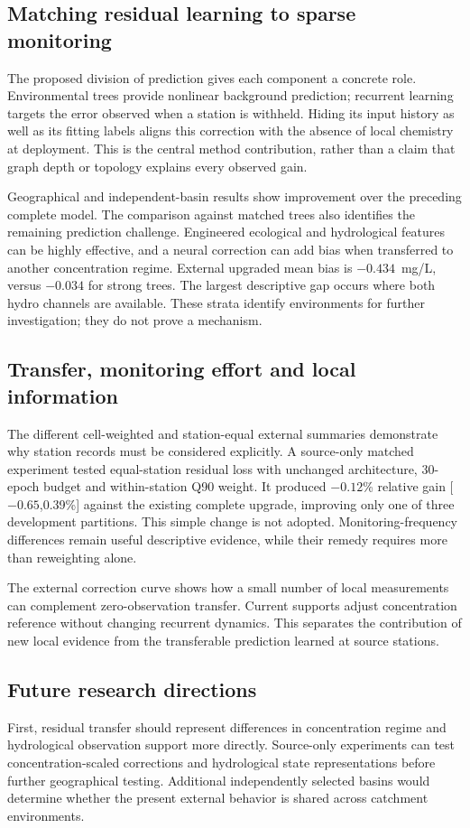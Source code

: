 \documentclass[11pt]{article}
\begin{document}
\subsection{Matching residual learning to sparse monitoring}
The proposed division of prediction gives each component a concrete role. Environmental trees provide nonlinear background prediction; recurrent learning targets the error observed when a station is withheld. Hiding its input history as well as its fitting labels aligns this correction with the absence of local chemistry at deployment. This is the central method contribution, rather than a claim that graph depth or topology explains every observed gain.

Geographical and independent-basin results show improvement over the preceding complete model. The comparison against matched trees also identifies the remaining prediction challenge. Engineered ecological and hydrological features can be highly effective, and a neural correction can add bias when transferred to another concentration regime. External upgraded mean bias is $-0.434$~mg/L, versus $-0.034$ for strong trees. The largest descriptive gap occurs where both hydro channels are available. These strata identify environments for further investigation; they do not prove a mechanism.

\subsection{Transfer, monitoring effort and local information}
The different cell-weighted and station-equal external summaries demonstrate why station records must be considered explicitly. A source-only matched experiment tested equal-station residual loss with unchanged architecture, 30-epoch budget and within-station Q90 weight. It produced $-0.12$\% relative gain [$-0.65$,0.39\%] against the existing complete upgrade, improving only one of three development partitions. This simple change is not adopted. Monitoring-frequency differences remain useful descriptive evidence, while their remedy requires more than reweighting alone.

The external correction curve shows how a small number of local measurements can complement zero-observation transfer. Current supports adjust concentration reference without changing recurrent dynamics. This separates the contribution of new local evidence from the transferable prediction learned at source stations.

\subsection{Future research directions}
First, residual transfer should represent differences in concentration regime and hydrological observation support more directly. Source-only experiments can test concentration-scaled corrections and hydrological state representations before further geographical testing. Additional independently selected basins would determine whether the present external behavior is shared across catchment environments.
\end{document}
